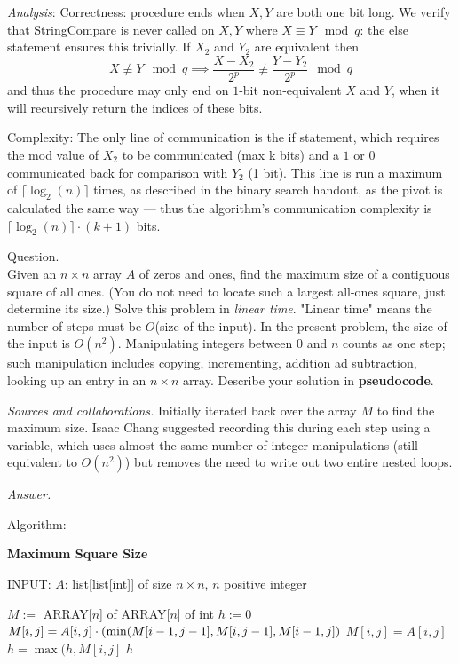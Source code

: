 \documentclass{amsart}
\begin{document}
\medskip \noindent 
\emph{Analysis}:
Correctness: procedure ends when $X, Y$ are both one bit long. We verify that StringCompare is never called on $X, Y$ where $X\equiv Y\mod q$: the else statement ensures this trivially. If $X_2$ and $Y_2$ are equivalent then \[X\not\equiv Y\mod q\implies \frac{X-X_2}{2^p}\not\equiv \frac{Y-Y_2}{2^p}\mod q\] and thus the procedure may only end on $1$-bit non-equivalent $X$ and $Y$, when it will recursively return the indices of these bits.

\medskip \noindent Complexity: The only line of communication is the if statement, which requires the mod value of $X_2$ to be communicated (max k bits) and a $1$ or $0$ communicated back for comparison with $Y_2$ (1 bit). This line is run a maximum of $\lceil \log_2(n)\rceil$ times, as described in the binary search handout, as the pivot is calculated the same way — thus the algorithm's communication complexity is $\lceil\log_2(n)\rceil \cdot (k+1)$ bits.
 

\newpage
{}

 Question. \\
Given an $n\times n$ array $A$ of zeros and ones, find the maximum size of a contiguous square of all ones. (You do not need to locate such a largest all-ones square, just determine its size.) Solve this problem in \emph{linear time}. "Linear time" means the number of steps must be $O$(size of the input). In the present problem, the size of the input is $O(n^2)$. Manipulating integers between $0$ and $n$ counts as one step; such manipulation includes copying, incrementing, addition ad subtraction, looking up an entry in an $n\times n$ array. Describe your solution in \textbf{pseudocode}.

\medskip \noindent
\emph{Sources and collaborations.}
Initially iterated back over the array $M$ to find the maximum size. Isaac Chang suggested recording this during each step using a variable, which uses almost the same number of integer manipulations (still equivalent to $O(n^2)$) but removes the need to write out two entire nested loops.

\medskip \noindent 
\emph{Answer.}

\medskip \noindent Algorithm:

\medskip \noindent 

	\textbf{Maximum Square Size}

\medskip INPUT: $A$: list[list[int]] of size $n\times n$, $n$ positive integer
\begin{algorithmic}[1]
	\State $M :=$ ARRAY[$n$] of ARRAY[$n$] of int\newline{}
	\State $h:=0$
			\State $M[i,j]= A[i,j]\cdot 
			\newline(\min(M[i-1,j-1],M[i, j-1],M[i-1,j])$
			\Else
			\State $M[i,j]= A[i,j]$
			\EndIf
			\State $h=\max(h, M[i,j]$
		\EndFor
	\EndFor
	\State \Return $h$
\EndProcedure
\end{algorithmic}
\end{document}

